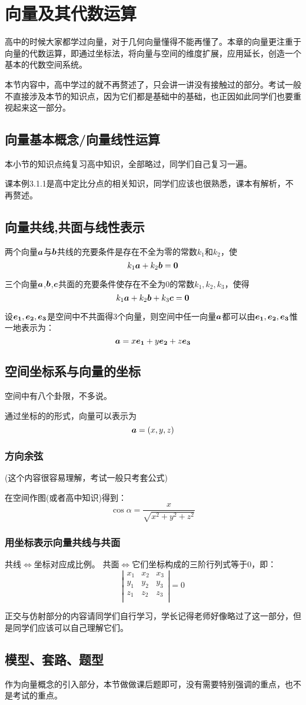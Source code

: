 \chapter{向量及其代数运算}

高中的时候大家都学过向量，对于几何向量懂得不能再懂了。本章的向量更注重于向量的代数运算，即通过坐标法，将向量与空间的维度扩展，应用延长，创造一个基本的代数空间系统。

本节内容中，高中学过的就不再赘述了，只会讲一讲没有接触过的部分。考试一般不直接涉及本节的知识点，因为它们都是基础中的基础，也正因如此同学们也要重视起来这一部分。

\section{向量基本概念/向量线性运算}
本小节的知识点纯复习高中知识，全部略过，同学们自己复习一遍。

课本例3.1.1是高中定比分点的相关知识，同学们应该也很熟悉，课本有解析，不再赘述。

\section{向量共线,共面与线性表示}
两个向量$\vb*{a}$与$\vb*{b}$共线的充要条件是存在不全为零的常数$k_1$和$k_2$，使
$$k_1\vb*{a}+k_2\vb*{b}=\vb*{0}$$

三个向量$\vb*{a}$,$\vb*{b}$,$\vb*{c}$共面的充要条件使存在不全为0的常数$k_1,k_2,k_3$，使得
$$k_1\vb*{a}+k_2\vb*{b}+k_3\vb*{c}=\vb*{0}$$

设$\vb*{e_1},\vb*{e_2},\vb*{e_3}$是空间中不共面得3个向量，则空间中任一向量$\vb*{a}$都可以由$\vb*{e_1},\vb*{e_2},\vb*{e_3}$惟一地表示为：
$$\vb*{a}=x\vb*{e_1}+y\vb*{e_2}+z\vb*{e_3}$$
\section{空间坐标系与向量的坐标}
空间中有八个卦限，不多说。

通过坐标的的形式，向量可以表示为
$$\vb*{a}=(x,y,z)$$
\subsection{方向余弦}
(这个内容很容易理解，考试一般只考套公式)

在空间作图(或者高中知识)得到：$$\cos\alpha=\frac{x}{\sqrt{x^2+y^2+z^2}}$$
\subsection{用坐标表示向量共线与共面}
共线$\Leftrightarrow$坐标对应成比例。
共面$\Leftrightarrow$它们坐标构成的三阶行列式等于0，即：
$$
    \left |
    \begin{matrix}
        x_1 & x_2 & x_3 \\
        y_1 & y_2 & y_3 \\
        z_1 & z_2 & z_3 \\
    \end{matrix}
    \right  |=0
$$

正交与仿射部分的内容请同学们自行学习，学长记得老师好像略过了这一部分，但是同学们应该可以自己理解它们。

\section{模型、套路、题型}
作为向量概念的引入部分，本节做做课后题即可，没有需要特别强调的重点，也不是考试的重点。